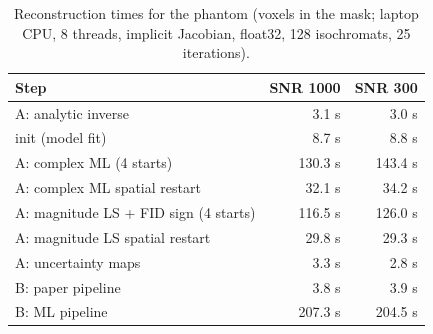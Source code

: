 \begin{table}[!htbp]
\centering
\caption{Reconstruction times for the phantom (voxels in the mask; laptop CPU, 8 threads, implicit Jacobian, float32, 128 isochromats, 25 iterations).}
\label{tab:phantomtime}
\small
\begin{tabular}{lrr}
\toprule
Step & SNR 1000 & SNR 300\\
\midrule
A: analytic inverse & 3.1 s & 3.0 s\\
init (model fit) & 8.7 s & 8.8 s\\
A: complex ML (4 starts) & 130.3 s & 143.4 s\\
A: complex ML spatial restart & 32.1 s & 34.2 s\\
A: magnitude LS + FID sign (4 starts) & 116.5 s & 126.0 s\\
A: magnitude LS spatial restart & 29.8 s & 29.3 s\\
A: uncertainty maps & 3.3 s & 2.8 s\\
B: paper pipeline & 3.8 s & 3.9 s\\
B: ML pipeline & 207.3 s & 204.5 s\\
\bottomrule
\end{tabular}
\end{table}
